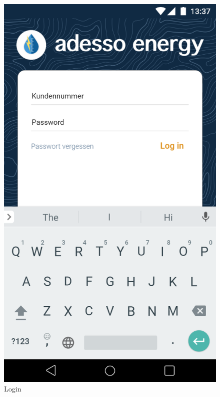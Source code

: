 \begin{figure}[h]
	\includegraphics[scale = 0.22]{img/AndroidMockup/login}		
	\caption{Login}
	\label{fig:mock-pw}
\end{figure}

